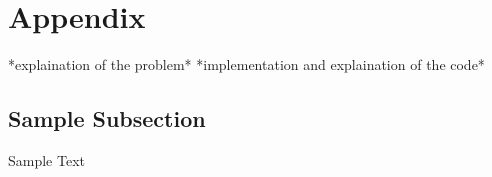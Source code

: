 \section{Appendix} \label{sec:appendix}
*explaination of the problem*
*implementation and explaination of the code*
\subsection{Sample Subsection}  \label{ssec:laser_technology}
Sample Text \cite{OurWork}